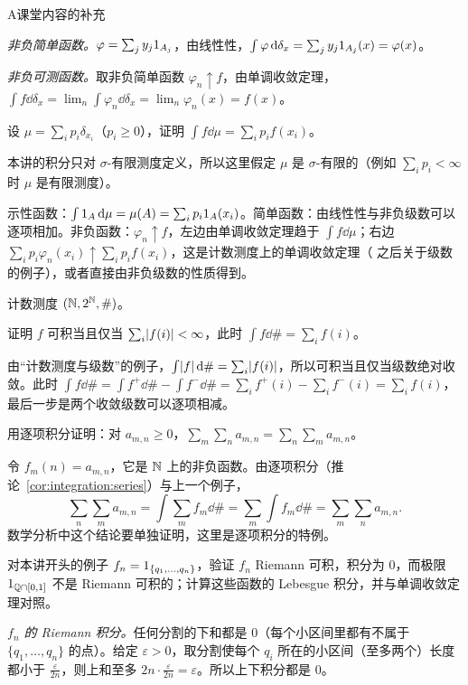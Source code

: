 \begin{exercises}{A}{课堂内容的补充}
\begin{questions}
\begin{solution}
\emph{非负简单函数。}$\varphi=\sum_jy_j1_{A_j}$，由线性性，$\int\varphi\,\mathrm{d}\delta_x=\sum_jy_j1_{A_j}(x)=\varphi(x)$。

\emph{非负可测函数。}取非负简单函数 $\varphi_n\uparrow f$，由单调收敛定理，$\int f\dd\delta_x=\lim_n\int\varphi_n\dd\delta_x=\lim_n\varphi_n(x)=f(x)$。
\end{solution}
\item 设 $\mu=\sum_ip_i\delta_{x_i}$（$p_i\geqslant0$），证明 $\int f\dd\mu=\sum_ip_if(x_i)$。
\begin{solution}
本讲的积分只对 $\sigma$-有限测度定义，所以这里假定 $\mu$ 是 $\sigma$-有限的（例如 $\sum_ip_i<\infty$ 时 $\mu$ 是有限测度）。

示性函数：$\int1_A\,\mathrm{d}\mu=\mu(A)=\sum_ip_i1_A(x_i)$。简单函数：由线性性与非负级数可以逐项相加。非负函数：$\varphi_n\uparrow f$，左边由单调收敛定理趋于 $\int f\dd\mu$；右边 $\sum_ip_i\varphi_n(x_i)\uparrow\sum_ip_if(x_i)$，这是计数测度上的单调收敛定理（ 之后关于级数的例子），或者直接由非负级数的性质得到。
\end{solution}
\end{questions}

\item\label{ex:integration:A3} 计数测度 $(\mathbb{N},2^{\mathbb{N}},\#)$。
\begin{questions}
\item 证明 $f$ 可积当且仅当 $\sum_i\lvert f(i)\rvert<\infty$，此时 $\int f\dd\#=\sum_if(i)$。
\begin{solution}
由“计数测度与级数”的例子，$\int\lvert f\rvert\,\mathrm{d}\#=\sum_i\lvert f(i)\rvert$，所以可积当且仅当级数绝对收敛。此时 $\int f\dd\#=\int f^+\dd\#-\int f^-\dd\#=\sum_if^+(i)-\sum_if^-(i)=\sum_if(i)$，最后一步是两个收敛级数可以逐项相减。
\end{solution}
\item 用逐项积分证明：对 $a_{m,n}\geqslant0$，$\sum_m\sum_na_{m,n}=\sum_n\sum_ma_{m,n}$。
\begin{solution}
令 $f_m(n)=a_{m,n}$，它是 $\mathbb{N}$ 上的非负函数。由逐项积分（推论~\ref{cor:integration:series}）与上一个例子，
\[
\sum_n\sum_ma_{m,n}=\int\sum_mf_m\dd\#=\sum_m\int f_m\dd\#=\sum_m\sum_na_{m,n}.
\]
数学分析中这个结论要单独证明，这里是逐项积分的特例。
\end{solution}
\end{questions}

\item\label{ex:integration:A4} 对本讲开头的例子 $f_n=1_{\{q_1,\dots,q_n\}}$，验证 $f_n$ Riemann 可积，积分为 $0$，而极限 $1_{\mathbb{Q}\cap[0,1]}$ 不是 Riemann 可积的；计算这些函数的 Lebesgue 积分，并与单调收敛定理对照。
\begin{solution}
\emph{$f_n$ 的 Riemann 积分。}任何分割的下和都是 $0$（每个小区间里都有不属于 $\{q_1,\dots,q_n\}$ 的点）。给定 $\varepsilon>0$，取分割使每个 $q_i$ 所在的小区间（至多两个）长度都小于 $\frac\varepsilon{2n}$，则上和至多 $2n\cdot\frac\varepsilon{2n}=\varepsilon$。所以上下积分都是 $0$。


\end{solution}
\end{exercises}
